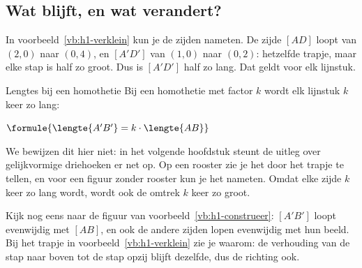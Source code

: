 \begin{oefeningen}
\end{oefeningen}

\subsection{Wat blijft, en wat verandert?}

In voorbeeld~\ref{vb:h1-verklein} kun je de zijden nameten. De zijde $[AD]$ loopt van $(2, 0)$ naar $(0, 4)$, en $[A'D']$ van $(1, 0)$ naar $(0, 2)$: hetzelfde trapje, maar elke stap is half zo groot. Dus is $[A'D']$ half zo lang. Dat geldt voor elk lijnstuk.

\begin{theorie}
\begin{stelling}{Lengtes bij een homothetie}
Bij een homothetie met factor $k$ wordt elk lijnstuk $k$ keer zo lang:

\vspace{1mm}
\qquad $\formule{\lengte{A'B'} = k \cdot \lengte{AB}}$
\end{stelling}
\end{theorie}

We bewijzen dit hier niet: in het volgende hoofdstuk steunt de uitleg over gelijkvormige driehoeken er net op. Op een rooster zie je het door het trapje te tellen, en voor een figuur zonder rooster kun je het nameten. Omdat elke zijde $k$ keer zo lang wordt, wordt ook de omtrek $k$ keer zo groot.


Kijk nog eens naar de figuur van voorbeeld~\ref{vb:h1-construeer}: $[A'B']$ loopt evenwijdig met $[AB]$, en ook de andere zijden lopen evenwijdig met hun beeld. Bij het trapje in voorbeeld~\ref{vb:h1-verklein} zie je waarom: de verhouding van de stap naar boven tot de stap opzij blijft dezelfde, dus de richting ook.

